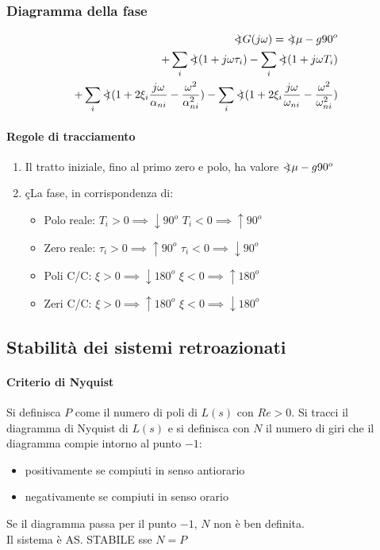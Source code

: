 \documentclass{article}
\newcommand{\arcangle}{%
	\mathord{<\mspace{-9mu}\mathrel{)}\mspace{2mu}}%
}
\begin{document}
	\subsubsection{Diagramma della fase}
	\begin{align*}
		\arcangle{G(j\omega)} = \arcangle\mu - g90^o\\
		+ \sum_i \arcangle(1+j\omega\tau_i) - \sum_i \arcangle(1+j\omega T_i)\\
		+ \sum_i \arcangle( 1+2\xi_i \frac{j\omega}{\alpha_{ni}} - \frac{\omega^2}{\alpha^2_{ni}}) - 
		\sum_i \arcangle(1+2\xi_i \frac{j\omega}{\omega_{ni}} - \frac{\omega^2}{\omega^2_{ni}})		
	\end{align*}
	\paragraph{Regole di tracciamento}
	\begin{enumerate}
		\item Il tratto iniziale, fino al primo zero e polo, ha valore $\arcangle\mu-g90^o$
		\item çLa fase, in corrispondenza di:
		\begin{itemize}
			\item Polo reale:
				\subitem $T_i > 0 \implies \downarrow 90^o$
				\subitem $T_i < 0 \implies \uparrow 90^o$
			\item Zero reale:
				\subitem $\tau_i > 0 \implies \uparrow 90^o$
				\subitem $\tau_i < 0 \implies \downarrow 90^o$
			\item Poli C/C:
				\subitem $\xi > 0 \implies \downarrow 180^o$
				\subitem $\xi < 0 \implies \uparrow 180^o$
			\item Zeri C/C:
				\subitem $\xi > 0 \implies \uparrow 180^o$
				\subitem $\xi < 0 \implies \downarrow 180^o$
		\end{itemize}
	\end{enumerate}

	\subsection{Stabilità dei sistemi retroazionati}
	\paragraph{Criterio di Nyquist}
	Si definisca $P$ come il numero di poli di $L(s)$ con $Re > 0$. Si tracci il diagramma di Nyquist di $L(s)$ e si definisca con $N$ il numero di giri che il diagramma compie intorno al punto $-1$:
	\begin{itemize}
		\item positivamente se compiuti in senso antiorario
		\item negativamente se compiuti in senso orario
	\end{itemize}
	Se il diagramma passa per il punto $-1$, $N$ non è ben definita.\\
	Il sistema è AS. STABILE sse $N=P$
\end{document}

